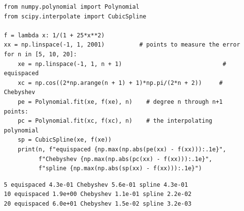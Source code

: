 \begin{verbatim}
from numpy.polynomial import Polynomial
from scipy.interpolate import CubicSpline

f = lambda x: 1/(1 + 25*x**2)
xx = np.linspace(-1, 1, 2001)          # points to measure the error
for n in [5, 10, 20]:
    xe = np.linspace(-1, 1, n + 1)                             # equispaced
    xc = np.cos((2*np.arange(n + 1) + 1)*np.pi/(2*n + 2))     # Chebyshev
    pe = Polynomial.fit(xe, f(xe), n)    # degree n through n+1 points:
    pc = Polynomial.fit(xc, f(xc), n)    # the interpolating polynomial
    sp = CubicSpline(xe, f(xe))
    print(n, f"equispaced {np.max(np.abs(pe(xx) - f(xx))):.1e}",
          f"Chebyshev {np.max(np.abs(pc(xx) - f(xx))):.1e}",
          f"spline {np.max(np.abs(sp(xx) - f(xx))):.1e}")
\end{verbatim}
\begin{verbatim}
5 equispaced 4.3e-01 Chebyshev 5.6e-01 spline 4.3e-01
10 equispaced 1.9e+00 Chebyshev 1.1e-01 spline 2.2e-02
20 equispaced 6.0e+01 Chebyshev 1.5e-02 spline 3.2e-03
\end{verbatim}

